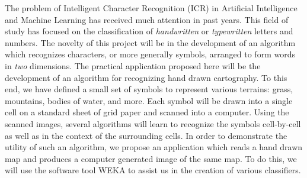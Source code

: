 
The problem of Intelligent Character Recognition (ICR) in Artificial
Intelligence and Machine Learning has received much attention in past years.
This field of study has focused on the classification of \emph{handwritten}  or
\emph{typewritten} letters and numbers.  The novelty of this project will be in
the development of an algorithm which recognizes characters, or more generally
symbols, arranged to form words in \emph{two} dimensions. The practical
application proposed here will be the development of an algorithm for
recognizing hand drawn cartography. To this end, we have defined a small set of
symbols to represent various terrains: grass, mountains, bodies of water, and
more. Each symbol will be drawn into a single cell on a standard sheet of grid
paper and scanned into a computer. Using the scanned images, several algorithms
will learn to recognize the symbols cell-by-cell as well as in the context of
the surrounding cells. In order to demonstrate the utility of such an
algorithm, we propose an application which reads a hand drawn map and produces
a computer generated image of the same map. To do this, we will use the
software tool WEKA\cite{hall2009} to assist us in the creation of various
classifiers.

